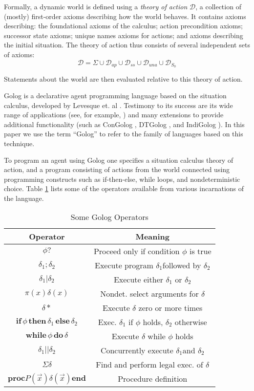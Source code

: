 \documentclass[letterpaper]{article}
\begin{document}
Formally, a dynamic world is defined using a \emph{theory of action}
$\mathcal{D}$, a collection of (mostly) first-order axioms describing
how the world behaves. It contains axioms describing: the foundational
axioms of the calculus; action precondition axioms; successor state
axioms; unique names axioms for actions; and axioms describing the
initial situation. The theory of action thus consists of several independent
sets of axioms:
\begin{equation}
\mathcal{D}=\Sigma\cup\mathcal{D}_{ap}\cup\mathcal{D}_{ss}\cup\mathcal{D}_{una}\cup\mathcal{D}_{S_{0}}
\end{equation}


Statements about the world are then evaluated relative to this theory
of action.

Golog is a declarative agent programming language based on the situation
calculus, developed by Levesque et. al \cite{levesque97golog}. Testimony
to its success are its wide range of applications (see, for example,
\cite{levesque97golog,Ferrein2005readylog} ) and many extensions
to provide additional functionality (such as ConGolog \cite{giacomo00congolog},
DTGolog \cite{boutilier00dtgolog}, and IndiGolog \cite{giacomo99indigolog}).
In this paper we use the term ``Golog'' to refer to the family
of languages based on this technique.

To program an agent using Golog one specifies a situation calculus
theory of action, and a program consisting of actions from the world
connected using programming constructs such as if-then-else, while
loops, and nondeterministic choice. Table \ref{tbl:Golog-Operators}
lists some of the operators available from various incarnations of
the language.

\begin{table}[t]
\begin{center}\begin{tabular}{|c|c|}
\hline 
Operator&
Meaning\tabularnewline
\hline
\hline 
$\phi?$&
Proceed only if condition $\phi$ is true\tabularnewline
\hline 
$\delta_{1};\delta_{2}$&
Execute program $\delta_{1}$followed by $\delta_{2}$\tabularnewline
\hline 
$\delta_{1}|\delta_{2}$&
Execute either $\delta_{1}$ or $\delta_{2}$\tabularnewline
\hline 
$\pi(x)\delta(x)$&
Nondet. select arguments for $\delta$\tabularnewline
\hline 
$\delta*$&
Execute $\delta$ zero or more times\tabularnewline
\hline 
$\mathbf{if}\,\phi\,\mathbf{then}\,\delta_{1}\,\mathbf{else}\,\delta_{2}$&
Exec. $\delta_{1}$ if $\phi$ holds, $\delta_{2}$ otherwise\tabularnewline
\hline 
$\mathbf{while\,}\phi\mathbf{\, do}\,\delta$&
Execute $\delta$ while $\phi$ holds\tabularnewline
\hline 
$\delta_{1}||\delta_{2}$&
Concurrently execute $\delta_{1}$and $\delta_{2}$\tabularnewline
\hline 
$\Sigma\delta$&
Find and perform legal exec. of $\delta$\tabularnewline
\hline 
$\mathbf{proc}P(\overrightarrow{x})\delta(\overrightarrow{x})\mathbf{end}$&
Procedure definition\tabularnewline
\hline
\end{tabular}\end{center}


\caption{Some Golog Operators\label{tbl:Golog-Operators}}
\end{table}
\end{document}
